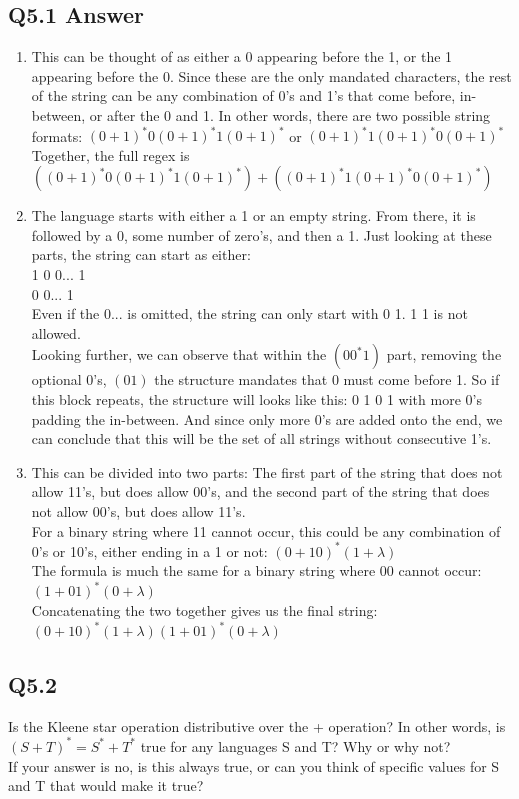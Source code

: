 \documentclass{article}
\begin{document}
\subsection*{Q5.1 Answer}
\begin{enumerate}[label=\alph*.]
    \item This can be thought of as either a 0 appearing before the 1, or the 1 appearing before the 0. Since these are the only mandated characters, the rest of the string can be any combination of 0's and 1's that come before, in-between, or after the 0 and 1. In other words, there are two possible string formats: $(0+1)^*0(0+1)^*1(0+1)^*$ or $(0+1)^*1(0+1)^*0(0+1)^*$
    \\ Together, the full regex is $((0+1)^*0(0+1)^*1(0+1)^*)+((0+1)^*1(0+1)^*0(0+1)^*)$
    \item The language starts with either a 1 or an empty string. From there, it is followed by a 0, some number of zero's, and then a 1. Just looking at these parts, the string can start as either:
    \\ 1 0 0... 1 
    \\ 0 0... 1
    \\ Even if the 0... is omitted, the string can only start with 0 1. 1 1 is not allowed.
    \\ Looking further, we can observe that within the $(00^*1)$ part, removing the optional 0's, $(01)$ the structure mandates that 0 must come before 1. So if this block repeats, the structure will looks like this: 0 1 0 1 with more 0's padding the in-between. And since only more 0's are added onto the end, we can conclude that this will be the set of all strings without consecutive 1's.
    \item This can be divided into two parts: The first part of the string that does not allow 11's, but does allow 00's, and the second part of the string that does not allow 00's, but does allow 11's.
    \\ For a binary string where 11 cannot occur, this could be any combination of 0's or 10's, either ending in a 1 or not: $(0+10)^*(1+\lambda)$
    \\ The formula is much the same for a binary string where 00 cannot occur: $(1+01)^*(0+\lambda)$
    \\ Concatenating the two together gives us the final string: $(0+10)^*(1+\lambda)(1+01)^*(0+\lambda)$
\end{enumerate}
\newpage
\subsection*{Q5.2}
Is the Kleene star operation distributive over the + operation? In other words, is $(S+T)^*=S^*+T^*$ true for any languages S and T? Why or why not?
\\ If your answer is no, is this always true, or can you think of specific values for S and T that would make it true?
\newpage
\end{document}
